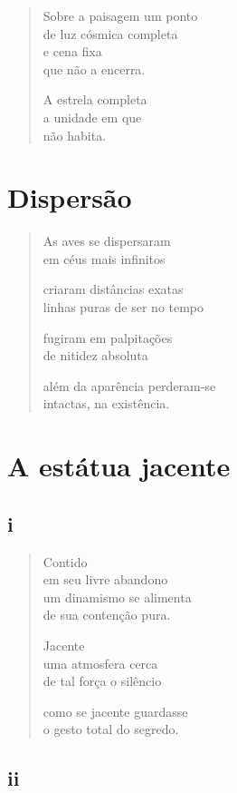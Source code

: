 \begin{verse}
Sobre a paisagem um ponto\\
de luz cósmica completa\\
e cena fixa\\
que não a encerra.

A estrela completa\\
a unidade em que\\
não habita.
\end{verse}

\chapter{Dispersão}

\begin{verse}
As aves se dispersaram\\
em céus mais infinitos

criaram distâncias exatas\\
linhas puras de ser no tempo

fugiram em palpitações\\
de nitidez absoluta

além da aparência perderam-se\\
intactas, na existência.
\end{verse}

\chapter{A estátua jacente}

\section{i}

\begin{verse}
Contido\\
em seu livre abandono\\
um dinamismo se alimenta\\
de sua contenção pura.

Jacente\\
uma atmosfera cerca\\
de tal força o silêncio

como se jacente guardasse\\
o gesto total do segredo.
\end{verse}

\medskip
\section{ii}

